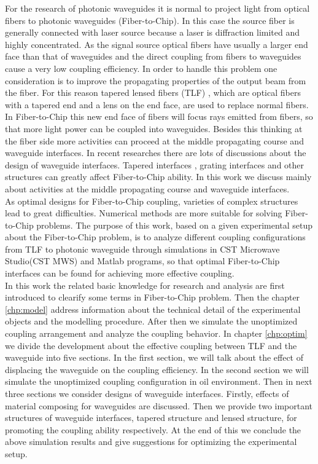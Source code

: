 For the research of photonic waveguides it is normal to project light from optical fibers to photonic waveguides (Fiber-to-Chip). In this case the source fiber is generally connected with laser source because a laser is diffraction limited and highly concentrated. As the signal source optical fibers have usually a larger end face than that of waveguides and the direct coupling from fibers to waveguides cause a very low coupling efficiency. In order to handle this problem one consideration is to improve the propagating properties of the output beam from the fiber. For this reason tapered lensed fibers (TLF) \cite{TLF_mode_transforming,TLF_analysis}, which are optical fibers with a tapered end and a lens on the end face, are used to replace normal fibers. In Fiber-to-Chip this new end face of fibers will focus rays emitted from fibers, so that more light power can be coupled into waveguides. Besides this thinking at the fiber side more activities can proceed at the middle propagating course and waveguide interfaces. In recent researches there are lots of discussions about the design of waveguide interfaces. Tapered interfaces \cite{design_fabrication_tapered_waveguide}, grating interfaces \cite{fiber_to_chip_grating_waveguides} and other structures can greatly affect Fiber-to-Chip ability. In this work we discuss mainly about activities at the middle propagating course and waveguide interfaces.\\ 

As optimal designs for Fiber-to-Chip coupling, varieties of complex structures lead to great difficulties. Numerical methods are more suitable for solving Fiber-to-Chip problems. The purpose of this work, based on a given experimental setup about the Fiber-to-Chip problem, is to analyze different coupling configurations from TLF to photonic waveguide through simulations in CST Microwave Studio\textregistered\hspace{0.1cm}(CST MWS) and Matlab programs, so that optimal Fiber-to-Chip interfaces can be found for achieving more effective coupling.\\

In this work the related basic knowledge for research and analysis are first introduced to clearify some terms in Fiber-to-Chip problem. Then the chapter \ref{chp:model} address information about the technical detail of the experimental objects and the modelling procedure. After then we simulate the unoptimized coupling arrangement and analyze the coupling behavior. In chapter \ref{chp:optim} we divide the development about the effective coupling between TLF and the waveguide into five sections. In the first section, we will talk about the effect of displacing the waveguide on the coupling efficiency. In the second section we will simulate the unoptimized coupling configuration in oil environment. Then in next three sections we consider designs of waveguide interfaces. Firstly, effects of material composing for waveguides are discussed. Then we provide two important structures of waveguide interfaces, tapered structure and lensed structure, for promoting the coupling ability respectively. At the end of this we conclude the above simulation results and give suggestions for optimizing the experimental setup.\\ 

